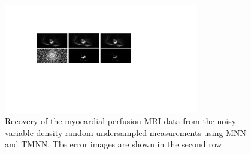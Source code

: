 \documentclass{article}
\begin{document}
\begin{figure}[htb]
  \centering
{\footnotesize
{}
}
\centerline{\includegraphics[width=8.5cm]{fig3.pdf}}
\caption{Recovery of the myocardial perfusion MRI data from the noisy variable density random undersampled measurements using MNN and TMNN. The error images are shown in the second row.}
\label{fig3}
\end{figure}
\end{document}
